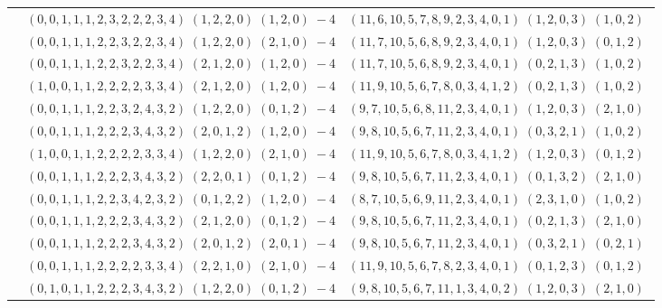 \documentclass[11pt]{article}
\begin{document}
\begin{longtable}[l]{|c|c|c|}
 \cline{2-3} 
 & $(0 ,0 ,1 ,1 ,1 ,2 ,3 ,2 ,2 ,2 ,3 ,4) \;(1 ,2 ,2 ,0) \;(1 ,2 ,0) \;-4$ & $(11 ,6 ,10 ,5 ,7 ,8 ,9 ,2 ,3 ,4 ,0 ,1) \;(1 ,2 ,0 ,3) \;(1 ,0 ,2) \;$\\ 
 \cline{2-3} 
 & $(0 ,0 ,1 ,1 ,1 ,2 ,2 ,3 ,2 ,2 ,3 ,4) \;(1 ,2 ,2 ,0) \;(2 ,1 ,0) \;-4$ & $(11 ,7 ,10 ,5 ,6 ,8 ,9 ,2 ,3 ,4 ,0 ,1) \;(1 ,2 ,0 ,3) \;(0 ,1 ,2) \;$\\ 
 \cline{2-3} 
 & $(0 ,0 ,1 ,1 ,1 ,2 ,2 ,3 ,2 ,2 ,3 ,4) \;(2 ,1 ,2 ,0) \;(1 ,2 ,0) \;-4$ & $(11 ,7 ,10 ,5 ,6 ,8 ,9 ,2 ,3 ,4 ,0 ,1) \;(0 ,2 ,1 ,3) \;(1 ,0 ,2) \;$\\ 
 \cline{2-3} 
 & $(1 ,0 ,0 ,1 ,1 ,2 ,2 ,2 ,2 ,3 ,3 ,4) \;(2 ,1 ,2 ,0) \;(1 ,2 ,0) \;-4$ & $(11 ,9 ,10 ,5 ,6 ,7 ,8 ,0 ,3 ,4 ,1 ,2) \;(0 ,2 ,1 ,3) \;(1 ,0 ,2) \;$\\ 
 \cline{2-3} 
 & $(0 ,0 ,1 ,1 ,1 ,2 ,2 ,3 ,2 ,4 ,3 ,2) \;(1 ,2 ,2 ,0) \;(0 ,1 ,2) \;-4$ & $(9 ,7 ,10 ,5 ,6 ,8 ,11 ,2 ,3 ,4 ,0 ,1) \;(1 ,2 ,0 ,3) \;(2 ,1 ,0) \;$\\ 
 \cline{2-3} 
 & $(0 ,0 ,1 ,1 ,1 ,2 ,2 ,2 ,3 ,4 ,3 ,2) \;(2 ,0 ,1 ,2) \;(1 ,2 ,0) \;-4$ & $(9 ,8 ,10 ,5 ,6 ,7 ,11 ,2 ,3 ,4 ,0 ,1) \;(0 ,3 ,2 ,1) \;(1 ,0 ,2) \;$\\ 
 \cline{2-3} 
 & $(1 ,0 ,0 ,1 ,1 ,2 ,2 ,2 ,2 ,3 ,3 ,4) \;(1 ,2 ,2 ,0) \;(2 ,1 ,0) \;-4$ & $(11 ,9 ,10 ,5 ,6 ,7 ,8 ,0 ,3 ,4 ,1 ,2) \;(1 ,2 ,0 ,3) \;(0 ,1 ,2) \;$\\ 
 \cline{2-3} 
 & $(0 ,0 ,1 ,1 ,1 ,2 ,2 ,2 ,3 ,4 ,3 ,2) \;(2 ,2 ,0 ,1) \;(0 ,1 ,2) \;-4$ & $(9 ,8 ,10 ,5 ,6 ,7 ,11 ,2 ,3 ,4 ,0 ,1) \;(0 ,1 ,3 ,2) \;(2 ,1 ,0) \;$\\ 
 \cline{2-3} 
 & $(0 ,0 ,1 ,1 ,1 ,2 ,2 ,3 ,4 ,2 ,3 ,2) \;(0 ,1 ,2 ,2) \;(1 ,2 ,0) \;-4$ & $(8 ,7 ,10 ,5 ,6 ,9 ,11 ,2 ,3 ,4 ,0 ,1) \;(2 ,3 ,1 ,0) \;(1 ,0 ,2) \;$\\ 
 \cline{2-3} 
 & $(0 ,0 ,1 ,1 ,1 ,2 ,2 ,2 ,3 ,4 ,3 ,2) \;(2 ,1 ,2 ,0) \;(0 ,1 ,2) \;-4$ & $(9 ,8 ,10 ,5 ,6 ,7 ,11 ,2 ,3 ,4 ,0 ,1) \;(0 ,2 ,1 ,3) \;(2 ,1 ,0) \;$\\ 
 \cline{2-3} 
 & $(0 ,0 ,1 ,1 ,1 ,2 ,2 ,2 ,3 ,4 ,3 ,2) \;(2 ,0 ,1 ,2) \;(2 ,0 ,1) \;-4$ & $(9 ,8 ,10 ,5 ,6 ,7 ,11 ,2 ,3 ,4 ,0 ,1) \;(0 ,3 ,2 ,1) \;(0 ,2 ,1) \;$\\ 
 \cline{2-3} 
 & $(0 ,0 ,1 ,1 ,1 ,2 ,2 ,2 ,2 ,3 ,3 ,4) \;(2 ,2 ,1 ,0) \;(2 ,1 ,0) \;-4$ & $(11 ,9 ,10 ,5 ,6 ,7 ,8 ,2 ,3 ,4 ,0 ,1) \;(0 ,1 ,2 ,3) \;(0 ,1 ,2) \;$\\ 
 \cline{2-3} 
 & $(0 ,1 ,0 ,1 ,1 ,2 ,2 ,2 ,3 ,4 ,3 ,2) \;(1 ,2 ,2 ,0) \;(0 ,1 ,2) \;-4$ & $(9 ,8 ,10 ,5 ,6 ,7 ,11 ,1 ,3 ,4 ,0 ,2) \;(1 ,2 ,0 ,3) \;(2 ,1 ,0) \;$\\ 

\end{longtable}
\end{document}
